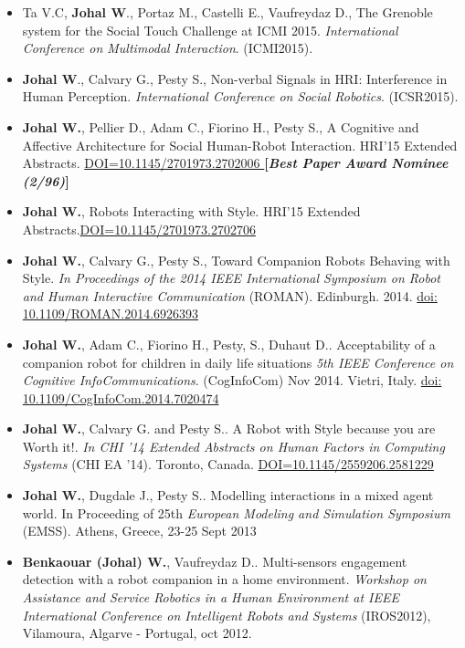 \documentclass[10pt]{article}
\begin{document}
\begin{itemize}
\item Ta V.C, \textbf{Johal W}., Portaz M., Castelli E., Vaufreydaz D., The Grenoble system for the Social Touch Challenge at ICMI 2015. \emph{International Conference on Multimodal Interaction}. (ICMI2015). 
	
\item  \textbf{Johal W}., Calvary G., Pesty S., Non-verbal Signals in HRI: Interference in Human Perception. \emph{International Conference on Social Robotics}. (ICSR2015). 
	
	
\item  \textbf{Johal W.}, Pellier D., Adam C., Fiorino H., Pesty S., A Cognitive and Affective Architecture for Social Human-Robot Interaction. HRI'15 Extended Abstracts. \href{http://doi.acm.org/10.1145/2701973.2702006}{DOI=10.1145/2701973.2702006 }  \textbf{[\textit{Best Paper Award Nominee (2/96)}]}
\item  \textbf{Johal W.}, Robots Interacting with Style. HRI'15 Extended Abstracts.\href{http://doi.acm.org/10.1145/2701973.2702706}{DOI=10.1145/2701973.2702706}   

\item \textbf{Johal W.}, Calvary G., Pesty S., Toward Companion Robots Behaving with Style. \emph{In Proceedings of the 2014 IEEE International Symposium on Robot and Human Interactive Communication} (ROMAN). Edinburgh. 2014. \href{ http://ieeexplore.ieee.org/stamp/stamp.jsp?tp=&arnumber=6926393&isnumber=6926219}{doi: 10.1109/ROMAN.2014.6926393}

\item \textbf{Johal W.}, Adam C., Fiorino H., Pesty, S., Duhaut D.. Acceptability of a companion
robot for children in daily life
situations \emph{5th IEEE Conference on Cognitive InfoCommunications}. (CogInfoCom) Nov 2014. Vietri, Italy. \href{http://ieeexplore.ieee.org/stamp/stamp.jsp?tp=&arnumber=7020474&isnumber=7020399}{doi: 10.1109/CogInfoCom.2014.7020474}


\item \textbf{Johal W.}, Calvary G. and  Pesty S.. A Robot with Style because you are Worth it!.  \emph{In CHI '14 Extended Abstracts on Human Factors in Computing Systems} (CHI EA '14). Toronto, Canada. \href{http://doi.acm.org/10.1145/2559206.2581229}{DOI=10.1145/2559206.2581229}

\item \textbf{Johal W.}, Dugdale J.,  Pesty S.. Modelling interactions in a mixed agent world. In Proceeding of 25th \emph{European Modeling and Simulation Symposium} (EMSS). Athens, Greece, 23-25 Sept 2013

\item  \textbf{Benkaouar (Johal) W.}, Vaufreydaz D.. Multi-sensors engagement detection with a robot companion in a home environment. \emph{Workshop on Assistance and Service Robotics in a Human Environment at IEEE International Conference on Intelligent Robots and Systems} (IROS2012), Vilamoura, Algarve - Portugal, oct 2012.

  

\end{itemize}
\end{document}
